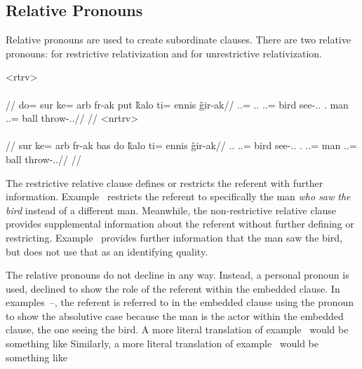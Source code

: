 \subsection{Relative Pronouns}
\label{subsec:tvk-relative-pronouns}

Relative pronouns are used to create subordinate clauses. There are two relative pronouns:   for restrictive relativization and   for unrestrictive relativization.

	\a<rtrv>\begingl
		\glpreamble{}\\
		\\
		//
		\gla do= sur ke= arb fr-ak put ǩalo ti= ennis ǧir-ak//
		\glb \An.\Sg.\Erg= \Tps.\An.\Abs{} \An.\Sg.\Dat= bird see-\Ind.\Pst.\Pfv{} \Rel.\Rtrv{} man \In.\Sg.\Acc= ball throw-\Ind.\Pst.\Pfv//
		\glft{}//
	\endgl
	\a<nrtrv>\begingl
		\glpreamble{}\\
		\\
		//
		\gla sur ke= arb fr-ak bas do ǩalo ti= ennis ǧir-ak//
		\glb \Tps.\An.\Abs{} \An.\Sg.\Dat= bird see-\Ind.\Pst.\Pfv{} \Rel.\Nrtrv{} \An.\Sg.\Erg= man \In.\Sg.\Acc= ball throw-\Ind.\Pst.\Pfv//
		\glft{}//
	\endgl
\xe

The restrictive relative clause defines or restricts the referent with further information. Example~ restricts the referent to specifically the man \emph{who saw the bird} instead of a different man. Meanwhile, the non-restrictive relative clause provides supplemental information about the referent without further defining or restricting. Example~ provides further information that the man saw the bird, but does not use that as an identifying quality.

The relative pronouns do not decline in any way. Instead, a personal pronoun is used, declined to show the role of the referent within the embedded clause. In examples~–, the referent    is referred to in the embedded clause using the pronoun   to show the absolutive case because the man is the actor within the embedded clause, the one seeing the bird. A more literal translation of example~ would be something like  Similarly, a more literal translation of example~ would be something like 

